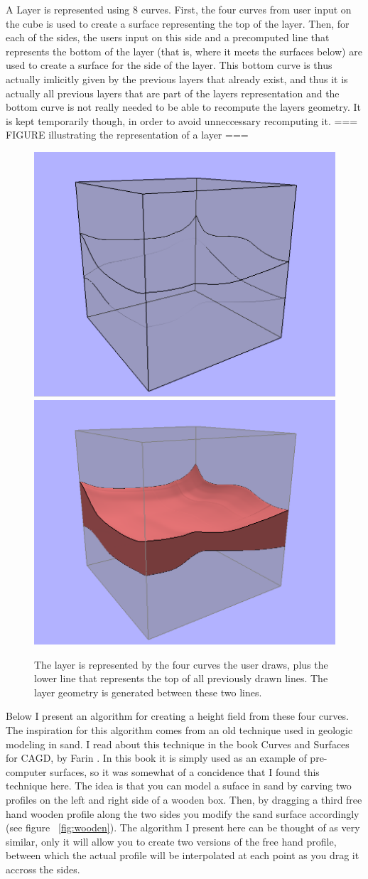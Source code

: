 \documentclass[a4paper,12pt]{report}
\begin{document}
A Layer is represented using 8 curves. First, the four curves from user input on the cube is used to create a surface representing the top of the layer. Then, for each of the sides, the users input on this side and a precomputed line that represents the bottom of the layer (that is, where it meets the surfaces below) are used to create a surface for the side of the layer. This bottom curve is thus actually imlicitly given by the previous layers that already exist, and thus it is actually all previous layers that are part of the layers representation and the bottom curve is not really needed to be able to recompute the layers geometry. It is kept temporarily though, in order to avoid unneccessary recomputing it. === FIGURE illustrating the representation of a layer ===

\begin{figure}
\includegraphics[width=.5\linewidth]{thesis/layerRepresentation1.png}
\includegraphics[width=.5\linewidth]{thesis/layerRepresentation2.png}
 \caption{The layer is represented by the four curves the user draws, plus the lower line that represents the top of all previously drawn lines. The layer geometry is generated between these two lines.}
 \label{fig:layerRep}
\end{figure}


Below I present an algorithm for creating a height field from these four curves. The inspiration for this algorithm comes from an old technique used in geologic modeling in sand. I read about this technique in the book Curves and Surfaces for CAGD, by Farin \cite{farin2001curves}. In this book it is simply used as an example of pre-computer surfaces, so it was somewhat of a concidence that I found this technique here. The idea is that you can model a suface in sand by carving two profiles on the left and right side of a wooden box. Then, by dragging a third free hand wooden profile along the two sides you modify the sand surface accordingly (see figure ~\ref{fig:wooden}). The algorithm I present here can be thought of as very similar, only it will allow you to create two versions of the free hand profile, between which the actual profile will be interpolated at each point as you drag it accross the sides.
\end{document}
